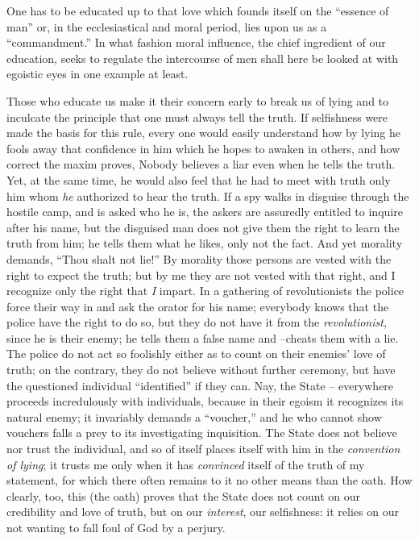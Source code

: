 \documentclass[12pt,a4paper]{book}
\begin{document}
One has to be educated up to that love which founds itself on the ``essence 
of man'' or, in the ecclesiastical and moral period, lies upon us as a 
``commandment.'' In what fashion moral influence, the chief ingredient of 
our education, seeks to regulate the intercourse of men shall here be looked 
at with egoistic eyes in one example at least.

Those who educate us make it their concern early to break us of lying and to 
inculcate the principle that one must always tell the truth. If selfishness 
were made the basis for this rule, every one would easily understand how by 
lying he fools away that confidence in him which he hopes to awaken in others, 
and how correct the maxim proves, Nobody believes a liar even when he tells 
the truth. Yet, at the same time, he would also feel that he had to meet with 
truth only him whom \textit{he} authorized to hear the truth. If a spy walks 
in disguise through the hostile camp, and is asked who he is, the askers are 
assuredly entitled to inquire after his name, but the disguised man does not 
give them the right to learn the truth from him; he tells them what he likes, 
only not the fact. And yet morality demands, ``Thou shalt not lie!'' By 
morality those persons are vested with the right to expect the truth; but by 
me they are not vested with that right, and I recognize only the right that 
\textit{I} impart. In a gathering of revolutionists the police force their way 
in and ask the orator for his name; everybody knows that the police have the 
right to do so, but they do not have it from the \textit{revolutionist}, since 
he is their enemy; he tells them a false name and --cheats them with a lie. 
The police do not act so foolishly either as to count on their enemies' love 
of truth; on the contrary, they do not believe without further ceremony, but 
have the questioned individual ``identified'' if they can. Nay, the State -- 
everywhere proceeds incredulously with individuals, because in their egoism it 
recognizes its natural enemy; it invariably demands a ``voucher,'' and he 
who cannot show vouchers falls a prey to its investigating inquisition. The 
State does not believe nor trust the individual, and so of itself places 
itself with him in the \textit{convention of lying}; it trusts me only when it 
has \textit{convinced} itself of the truth of my statement, for which there 
often remains to it no other means than the oath. How clearly, too, this (the 
oath) proves that the State does not count on our credibility and love of 
truth, but on our \textit{interest}, our selfishness: it relies on our not 
wanting to fall foul of God by a perjury.
\end{document}

